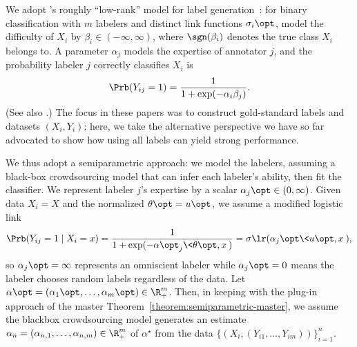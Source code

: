 We adopt \citeauthor{WhitehillWuBeMoRu09}'s roughly ``low-rank'' model for
label generation~\citep{WhitehillWuBeMoRu09}: for binary classification with
$m$ labelers and distinct link functions $\sigma_i\opt$, model the
difficulty of $X_i$ by $\beta_i \in (-\infty, \infty)$, where
$\sgn(\beta_i)$ denotes the true class $X_i$ belongs to.  A parameter
$\alpha_j$ models the expertise of annotator $j$, and the probability
labeler $j$ correctly classifies $X_i$ is
\begin{align*}
  \Prb(Y_{ij} = 1) = \frac{1}{1 +\exp(-\alpha_i \beta_j)}.
\end{align*}
(See also \citet{RaykarYuZhVaFlBoMo10}.) 
The focus in these papers was to construct gold-standard labels
and datasets $(X_i, Y_i)$; here, we take the alternative perspective
we have so far advocated to show how using all labels can yield strong
performance.


We thus adopt a semiparametric approach: we model the labelers, assuming a
black-box crowdsourcing model that can infer each labeler's ability, then
fit the classifier.  We represent labeler $j$'s expertise by a scalar
$\alpha_j\opt \in (0, \infty)$. Given data $X_i = X$ and the normalized
$\theta\opt = u\opt$, we assume a modified logistic link
\begin{align*}
  \Prb(Y_{ij} = 1 \mid X_i = x) = \frac{1}{1 + \exp (-\alpha\opt_j  \< \theta\opt, x \>)} = \sigma\lr (\alpha_j\opt  \< u \opt, x \>),
\end{align*}
so $\alpha_j\opt = \infty$ represents an omniscient labeler while
$\alpha_j\opt = 0$ means the labeler chooses random labels regardless of the
data. Let $\alpha\opt = (\alpha_1\opt, \ldots, \alpha_m\opt) \in
\R^m_{+}$. Then, in keeping with the plug-in approach of the master
Theorem~\ref{theorem:semiparametric-master}, we assume the blackbox
crowdsourcing model generates an estimate $\alpha_n = (\alpha_{n,1},
\ldots, \alpha_{n,m}) \in \R_+^m$ of $\alpha^\star$ from the data $\{(X_i,
(Y_{i1}, \ldots, Y_{im}))\}_{i=1}^n$.



